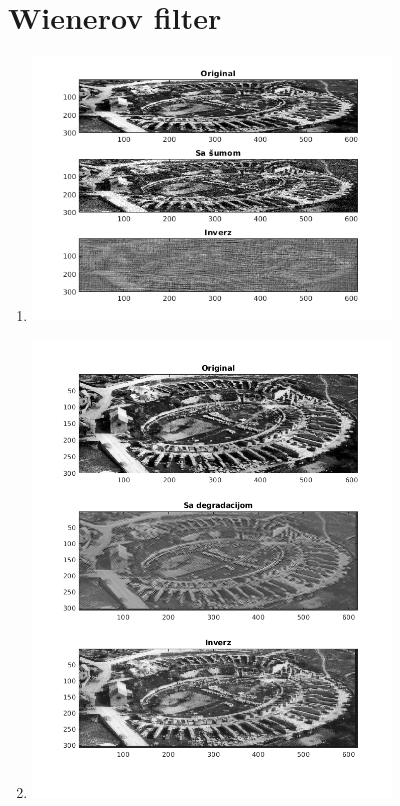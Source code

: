 \documentclass[12pt, a4]{report}
\begin{document}
\section{Wienerov filter}
\begin{enumerate}
	\item
	      \begin{minipage}{\linewidth}
		      \centering
		      \includegraphics[width=0.75\textwidth]{weinernoise}
	      \end{minipage}
	\item
	      \begin{minipage}{\linewidth}
		      \centering
		      \includegraphics[width=0.75\textwidth]{weinerpsf}

\end{minipage}
\end{enumerate}
\end{document}
